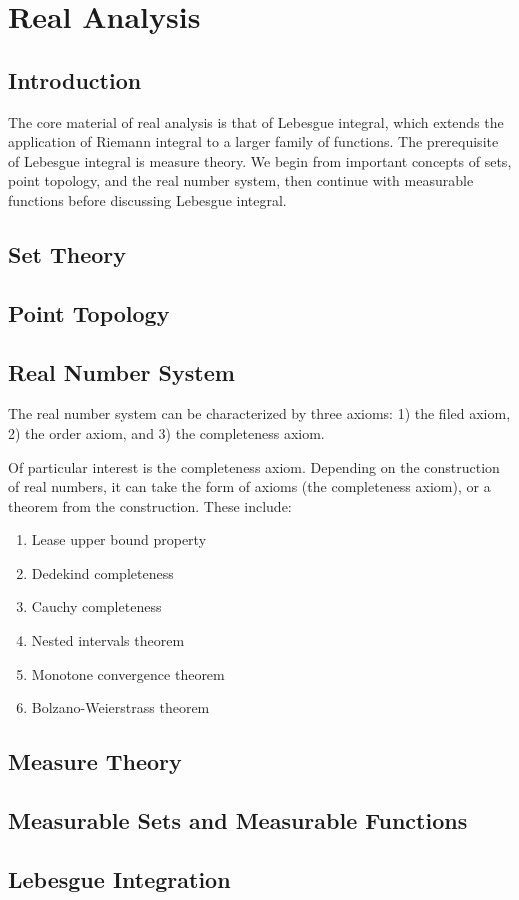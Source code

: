 \chapter{Real Analysis}
\section{Introduction}
The core material of real analysis is that of Lebesgue integral, which extends the application of Riemann integral to a larger family of functions. The prerequisite of Lebesgue integral is measure theory. We begin from important concepts of sets, point topology, and the real number system, then continue with measurable functions before discussing Lebesgue integral.

\section{Set Theory}


\section{Point Topology}
\section{Real Number System}
The real number system can be characterized by three axioms: 1) the filed axiom, 2) the order axiom, and 3) the completeness axiom.

Of particular interest is the completeness axiom. Depending on the construction of real numbers, it can take the form of axioms (the completeness axiom), or a theorem from the construction. These include:
\begin{enumerate}
	\item Lease upper bound property
	\item Dedekind completeness
	\item Cauchy completeness
	\item Nested intervals theorem
	\item Monotone convergence theorem
	\item Bolzano-Weierstrass theorem
\end{enumerate}

\section{Measure Theory}

\section{Measurable Sets and Measurable Functions}

\section{Lebesgue Integration}
